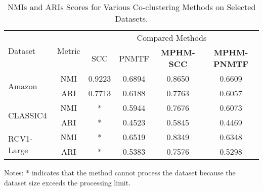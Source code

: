 \begin{table*}[htbp]
    \centering
    \caption{NMIs and ARIs Scores for Various Co-clustering Methods on Selected Datasets.}
    \label{tab:evaluation-metrics}
    \begin{tabular}{@{} l c cccc @{}}
        \toprule
        \multirow{2}{*}{Dataset}    & \multirow{2}{*}{Metric} & \multicolumn{4}{c}{Compared Methods}                                                                                                        \\
        \cmidrule{3-6}
                                    &                         & SCC \cite{dhillon2001CoclusteringDocumentsWords} & PNMTF \cite{chen2023ParallelNonNegativeMatrix} & \textbf{MPHM-SCC} & \textbf{MPHM-PNMTF} \\
        \midrule
        \multirow{2}{*}{Amazon}     & NMI                     & 0.9223                                           & 0.6894                                         & 0.8650            & 0.6609              \\
                                    & ARI                     & 0.7713                                           & 0.6188                                         & 0.7763            & 0.6057              \\
        \multirow{2}{*}{CLASSIC4}   & NMI                     & *                                                & 0.5944                                         & 0.7676            & 0.6073              \\
                                    & ARI                     & *                                                & 0.4523                                         & 0.5845            & 0.4469              \\
        \multirow{2}{*}{RCV1-Large} & NMI                     & *                                                & 0.6519                                         & 0.8349            & 0.6348              \\
                                    & ARI                     & *                                                & 0.5383                                         & 0.7576            & 0.5298              \\
        \bottomrule
    \end{tabular}
    \begin{tablenotes}
        \small
        \item Notes: * indicates that the method cannot process the dataset because the dataset size exceeds the processing limit.
    \end{tablenotes}
\end{table*}
